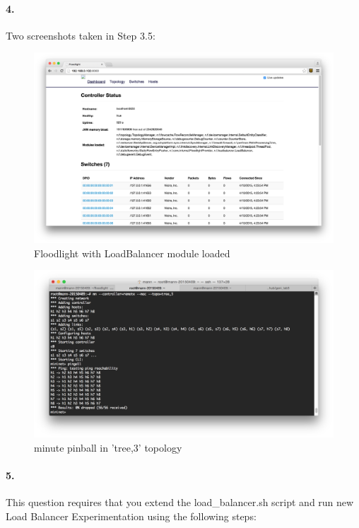 \documentclass[a4paper]{article}
\begin{document}
\paragraph{4. } Two screenshots taken in Step 3.5:
\begin{figure}[H]
  \centering
    \includegraphics[scale=.34]{floodlight_ui.png}
  \caption{Floodlight with LoadBalancer module loaded}
\end{figure}
\begin{figure}[H]
  \centering
    \includegraphics[scale=.44]{pingall.png}
  \caption{minute pinball in 'tree,3' topology}
\end{figure}

\paragraph{5. } This question requires that you extend the load\_balancer.sh script and run new Load Balancer Experimentation using the following steps: \\
\end{document}
